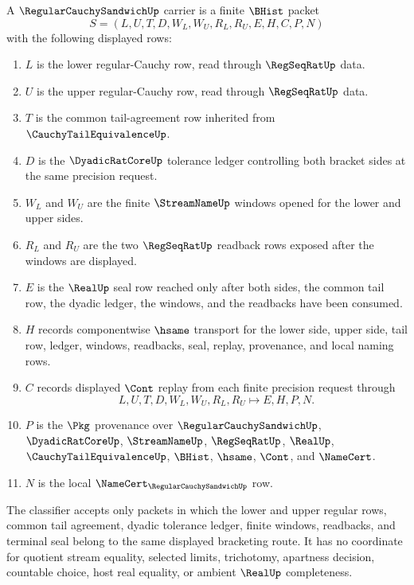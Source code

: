 \begin{definition}
\label{def:regular-cauchy-sandwich-carrier}
A $\RegularCauchySandwichUp$ carrier is a finite $\BHist$ packet
$$
S=(L,U,T,D,W_L,W_U,R_L,R_U,E,H,C,P,N)
$$
with the following displayed rows:
\begin{enumerate}
\item $L$ is the lower regular-Cauchy row, read through $\RegSeqRatUp$ data.
\item $U$ is the upper regular-Cauchy row, read through $\RegSeqRatUp$ data.
\item $T$ is the common tail-agreement row inherited from $\CauchyTailEquivalenceUp$.
\item $D$ is the $\DyadicRatCoreUp$ tolerance ledger controlling both bracket sides at the same precision request.
\item $W_L$ and $W_U$ are the finite $\StreamNameUp$ windows opened for the lower and upper sides.
\item $R_L$ and $R_U$ are the two $\RegSeqRatUp$ readback rows exposed after the windows are displayed.
\item $E$ is the $\RealUp$ seal row reached only after both sides, the common tail row, the dyadic ledger, the windows, and the readbacks have been consumed.
\item $H$ records componentwise $\hsame$ transport for the lower side, upper side, tail row, ledger, windows, readbacks, seal, replay, provenance, and local naming rows.
\item $C$ records displayed $\Cont$ replay from each finite precision request through
$$
L,U,T,D,W_L,W_U,R_L,R_U \longmapsto E,H,P,N .
$$
\item $P$ is the $\Pkg$ provenance over $\RegularCauchySandwichUp$, $\DyadicRatCoreUp$, $\StreamNameUp$, $\RegSeqRatUp$, $\RealUp$, $\CauchyTailEquivalenceUp$, $\BHist$, $\hsame$, $\Cont$, and $\NameCert$.
\item $N$ is the local $\NameCert_{\RegularCauchySandwichUp}$ row.
\end{enumerate}
The classifier accepts only packets in which the lower and upper regular rows, common tail agreement, dyadic tolerance ledger, finite windows, readbacks, and terminal seal belong to the same displayed bracketing route. It has no coordinate for quotient stream equality, selected limits, trichotomy, apartness decision, countable choice, host real equality, or ambient $\RealUp$ completeness.
\end{definition}

